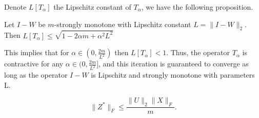 \documentclass[twoside]{article}
\begin{document}

Denote $L[T_\alpha]$ the Lipschitz constant of $T_\alpha$, we have the following proposition.

\begin{proposition}
\label{lem:upper_LT}
Let $I - W$ be $m$-strongly monotone with Lipschitz constant $L = \|I - W\|_2$. 
Then
$L[T_\alpha] \leq \sqrt{1-2 \alpha m+\alpha^{2} L^{2}}$
\end{proposition}


This implies that for $\alpha \in \left(0, \frac{2m}{L^2} \right)$ then $ L[T_\alpha] < 1$. 
Thus, the operator $T_\alpha$ is contractive for any $\alpha \in (0, \frac{2m}{L^2}]$, and this iteration is guaranteed to converge as long as the operator $I - W$ is Lipschitz and strongly monotone with parameters L. 

\begin{lemma}[Bound on $\|Z^*\|_F$]\label{lem:Zstar_norm}
\begin{equation}\label{eq:Zstar_norm}
  \|Z^*\|_F \leq \frac{\|U\|_2\|X\|_F}{m}.
\end{equation}
\end{lemma}
\end{document}

